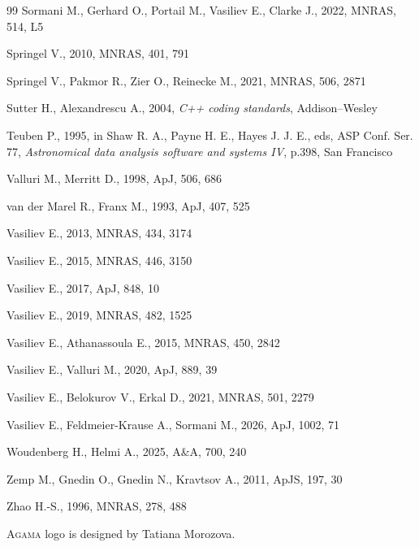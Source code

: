 \documentclass[12pt]{article}
\newcommand{\Agama}{\textsc{Agama}\xspace}
\begin{document}
\begin{thebibliography}{99}
Sormani M., Gerhard O., Portail M., Vasiliev E., Clarke J., 2022, MNRAS, 514, L5

Springel V., 2010, MNRAS, 401, 791

Springel V., Pakmor R., Zier O., Reinecke M., 2021, MNRAS, 506, 2871

Sutter H., Alexandrescu A., 2004, \textsl{C++ coding standards}, Addison--Wesley

Teuben P., 1995, in Shaw R. A., Payne H. E., Hayes J. J. E., eds, ASP Conf. Ser. 77,
\textsl{Astronomical data analysis software and systems IV}, p.398, San Francisco

Valluri M., Merritt D., 1998, ApJ, 506, 686

van der Marel R., Franx M., 1993, ApJ, 407, 525

Vasiliev E., 2013, MNRAS, 434, 3174

Vasiliev E., 2015, MNRAS, 446, 3150

Vasiliev E., 2017, ApJ, 848, 10

Vasiliev E., 2019, MNRAS, 482, 1525

Vasiliev E., Athanassoula E., 2015, MNRAS, 450, 2842

Vasiliev E., Valluri M., 2020, ApJ, 889, 39

Vasiliev E., Belokurov V., Erkal D., 2021, MNRAS, 501, 2279

Vasiliev E., Feldmeier-Krause A., Sormani M., 2026, ApJ, 1002, 71

Woudenberg H., Helmi A., 2025, A\&A, 700, 240

Zemp M., Gnedin O., Gnedin N., Kravtsov A., 2011, ApJS, 197, 30

Zhao H.-S., 1996, MNRAS, 278, 488

\end{thebibliography}

\vspace{-3mm}\noindent \Agama logo is designed by Tatiana Morozova.
\end{document}
